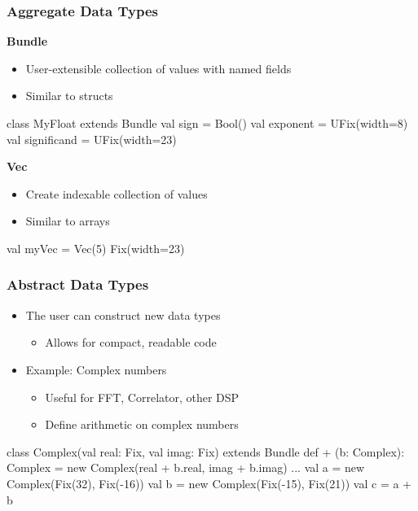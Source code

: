 \documentclass[xcolor=pdflatex,dvipsnames,table]{beamer}
\begin{document}
\begin{frame}[fragile]
\frametitle{Aggregate Data Types}

\textbf{Bundle}

\begin{itemize}
\item User-extensible collection of values with named fields
\item Similar to structs
\end{itemize}

\begin{footnotesize}
\begin{scala}
class MyFloat extends Bundle{
  val sign        = Bool()
  val exponent    = UFix(width=8)
  val significand = UFix(width=23)
}
\end{scala}
\end{footnotesize}

\textbf{Vec}

\begin{itemize}
\item Create indexable collection of values
\item Similar to arrays
\end{itemize}

\begin{footnotesize}
\begin{scala}
val myVec = Vec(5){ Fix(width=23) }
\end{scala}
\end{footnotesize}

\end{frame}


\begin{frame}[fragile]
\frametitle{Abstract Data Types}
\begin{itemize}
\item The user can construct new data types
\begin{itemize}
\item Allows for compact, readable code
\end{itemize}
\item Example: Complex numbers
\begin{itemize}
\item Useful for FFT, Correlator, other DSP
\item Define arithmetic on complex numbers
\end{itemize}
\end{itemize}

\begin{footnotesize}
\begin{scala}
class Complex(val real: Fix, val imag: Fix) 
    extends Bundle {
  def + (b: Complex): Complex = 
    new Complex(real + b.real, imag + b.imag)
  ...
}
val a = new Complex(Fix(32), Fix(-16))
val b = new Complex(Fix(-15), Fix(21))
val c = a + b
\end{scala}
\end{footnotesize}

\end{frame}
\end{document}
